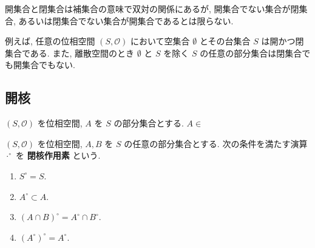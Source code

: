 \begin{rem*}
    開集合と閉集合は補集合の意味で双対の関係にあるが, 開集合でない集合が閉集合, あるいは閉集合でない集合が開集合であるとは限らない.

    例えば, 任意の位相空間 $(S, \mathcal{O})$ において空集合 $\emptyset$ とその台集合 $S$ は開かつ閉集合である.
    また, 離散空間のとき $\emptyset$ と $S$ を除く $S$ の任意の部分集合は閉集合でも開集合でもない.
\end{rem*}

\subsection{開核}
$(S,\mathcal{O})$ を位相空間, $A$ を $S$ の部分集合とする. $A\in$

\begin{framed}
    \begin{dfn}[]\label{dfn::inner-op}
        $(S,\mathcal{O})$ を位相空間, $A,B$ を $S$ の任意の部分集合とする. 次の条件を満たす演算 $\cdot^\circ$ を \textbf{閉核作用素} という.

        \begin{enumerate}
            \item $S^\circ=S.$
            \item $A^\circ\subset A.$
            \item $(A\cap B)^\circ=A^\circ\cap B^\circ.$
            \item $(A^\circ)^\circ=A^\circ.$
        \end{enumerate}
    \end{dfn}
\end{framed}
